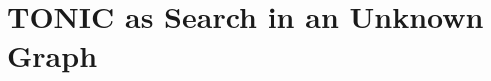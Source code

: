 \documentclass[prodmode,acmtecs]{acmsmall} %
\begin{document}






\section{TONIC as Search in an Unknown Graph} 
\label{sec:TONICAsHeuristic}
\end{document}
